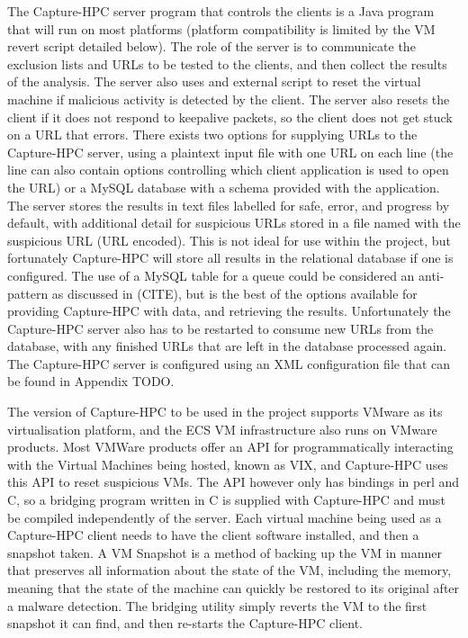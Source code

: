 The Capture-HPC server program that controls the clients is a Java program that
will run on most platforms (platform compatibility is limited by the VM revert
script detailed below). The role of the server is to communicate the exclusion
lists and URLs to be tested to the clients, and then collect the results of the
analysis. The server also uses and external script to reset the virtual machine
if malicious activity is detected by the client. The server also resets the
client if it does not respond to keepalive packets, so the client does not get
stuck on a URL that errors. There exists two options for supplying URLs to the
Capture-HPC server, using a plaintext input file with one URL on each line (the
line can also contain options controlling which client application is used to
open the URL) or a MySQL database with a schema provided with the application.
The server stores the results in text files labelled for safe, error, and
progress by default, with additional detail for suspicious URLs stored in a file
named with the suspicious URL (URL encoded). This is not ideal for use within
the project, but fortunately Capture-HPC will store all results in the
relational database if one is configured. The use of a MySQL table for a queue
could be considered an anti-pattern as discussed in (CITE), but is the best of
the options available for providing Capture-HPC with data, and retrieving the
results. Unfortunately the Capture-HPC server also has to be restarted to
consume new URLs from the database, with any finished URLs that are left in the
database processed again. The Capture-HPC server is configured using an XML
configuration file that can be found in Appendix TODO.

The version of Capture-HPC to be used in the project supports VMware as its
virtualisation platform, and the ECS VM infrastructure also runs on VMware
products. Most VMWare products offer an API for programmatically interacting
with the Virtual Machines being hosted, known as VIX, and Capture-HPC uses this
API to reset suspicious VMs. The API however only has bindings in perl and C,
so a bridging program written in C is supplied with Capture-HPC and must be
compiled independently of the server. Each virtual machine being used as a
Capture-HPC client needs to have the client software installed, and then a
snapshot taken. A VM Snapshot is a method of backing up the VM in manner that
preserves all information about the state of the VM, including the memory,
meaning that the state of the machine can quickly be restored to its original
after a malware detection. The bridging utility simply reverts the VM to the
first snapshot it can find, and then re-starts the Capture-HPC client.

